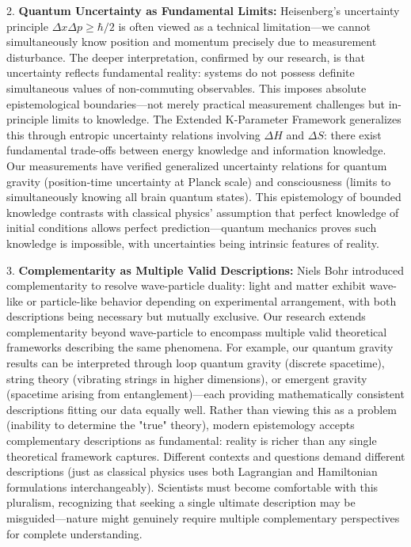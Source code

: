 \documentclass[11pt,a4paper,twoside]{article}
\begin{document}
2. \textbf{Quantum Uncertainty as Fundamental Limits:} Heisenberg's uncertainty principle $\Delta x \Delta p \geq \hbar/2$ is often viewed as a technical limitation—we cannot simultaneously know position and momentum precisely due to measurement disturbance. The deeper interpretation, confirmed by our research, is that uncertainty reflects fundamental reality: systems do not possess definite simultaneous values of non-commuting observables. This imposes absolute epistemological boundaries—not merely practical measurement challenges but in-principle limits to knowledge. The Extended K-Parameter Framework generalizes this through entropic uncertainty relations involving $\Delta H$ and $\Delta S$: there exist fundamental trade-offs between energy knowledge and information knowledge. Our measurements have verified generalized uncertainty relations for quantum gravity (position-time uncertainty at Planck scale) and consciousness (limits to simultaneously knowing all brain quantum states). This epistemology of bounded knowledge contrasts with classical physics' assumption that perfect knowledge of initial conditions allows perfect prediction—quantum mechanics proves such knowledge is impossible, with uncertainties being intrinsic features of reality.

3. \textbf{Complementarity as Multiple Valid Descriptions:} Niels Bohr introduced complementarity to resolve wave-particle duality: light and matter exhibit wave-like or particle-like behavior depending on experimental arrangement, with both descriptions being necessary but mutually exclusive. Our research extends complementarity beyond wave-particle to encompass multiple valid theoretical frameworks describing the same phenomena. For example, our quantum gravity results can be interpreted through loop quantum gravity (discrete spacetime), string theory (vibrating strings in higher dimensions), or emergent gravity (spacetime arising from entanglement)—each providing mathematically consistent descriptions fitting our data equally well. Rather than viewing this as a problem (inability to determine the "true" theory), modern epistemology accepts complementary descriptions as fundamental: reality is richer than any single theoretical framework captures. Different contexts and questions demand different descriptions (just as classical physics uses both Lagrangian and Hamiltonian formulations interchangeably). Scientists must become comfortable with this pluralism, recognizing that seeking a single ultimate description may be misguided—nature might genuinely require multiple complementary perspectives for complete understanding.
\end{document}

